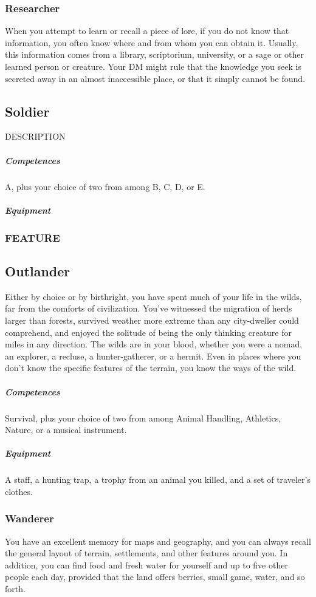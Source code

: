     \subsubsection{Researcher} \label{feat::researcher}
        When you attempt to learn or recall a piece of lore, if you do not know that information, you often know where and from whom you can obtain it.
        Usually, this information comes from a library, scriptorium, university, or a sage or other learned person or creature.
        Your DM might rule that the knowledge you seek is secreted away in an almost inaccessible place, or that it simply cannot be found.

\subsection*{Soldier} \label{ssec::soldier}
    DESCRIPTION
    \subparagraph{Competences} A, plus your choice of two from among B, C, D, or E.
    \subparagraph{Equipment}
    \subsubsection{FEATURE}

\subsection*{Outlander} \label{ssec::outlander}
    Either by choice or by birthright, you have spent much of your life in the wilds, far from the comforts of civilization.
    You've witnessed the migration of herds larger than forests, survived weather more extreme than any city-dweller could comprehend, and enjoyed the solitude of being the only thinking creature for miles in any direction.
    The wilds are in your blood, whether you were a nomad, an explorer, a recluse, a hunter-gatherer, or a hermit.
    Even in places where you don't know the specific features of the terrain, you know the ways of the wild.
    \subparagraph{Competences} Survival, plus your choice of two from among Animal Handling, Athletics, Nature, or a musical instrument.
    \subparagraph{Equipment} A staff, a hunting trap, a trophy from an animal you killed, and a set of traveler's clothes.
    \subsubsection{Wanderer}
        You have an excellent memory for maps and geography, and you can always recall the general layout of terrain, settlements, and other features around you.
        In addition, you can find food and fresh water for yourself and up to five other people each day, provided that the land offers berries, small game, water, and so forth.

